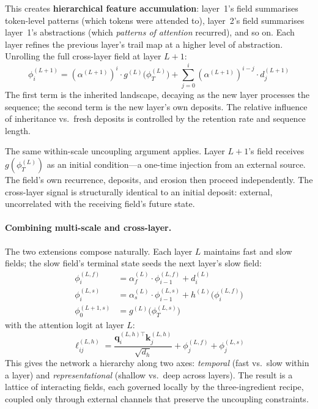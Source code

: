\documentclass[11pt,a4paper]{article}
\newcommand{\retain}{\alpha}
\newcommand{\q}{\bm{q}}
\newcommand{\K}{\bm{k}}
\begin{document}
This creates \textbf{hierarchical feature accumulation}: layer~1's
field summarises token-level patterns (which tokens were attended
to), layer~2's field summarises layer~1's abstractions (which
\emph{patterns of attention} recurred), and so on.  Each layer
refines the previous layer's trail map at a higher level of
abstraction.  Unrolling the full cross-layer field at layer $L+1$:
\begin{equation}
    \phi_i^{(L+1)} = (\retain^{(L+1)})^i \cdot g^{(L)}\!\bigl(\phi_T^{(L)}\bigr)
    + \sum_{j=0}^{i} (\retain^{(L+1)})^{i-j} \cdot d_j^{(L+1)}
    \label{eq:crosslayer_unrolled}
\end{equation}
The first term is the inherited landscape, decaying as the new
layer processes the sequence; the second term is the new layer's own
deposits.  The relative influence of inheritance vs.\ fresh deposits
is controlled by the retention rate and sequence length.

The same within-scale uncoupling argument applies.  Layer $L+1$'s
field receives $g(\phi_T^{(L)})$ as an initial condition---a
one-time injection from an external source.  The field's own
recurrence, deposits, and erosion then proceed independently.  The
cross-layer signal is structurally identical to an initial deposit:
external, uncorrelated with the receiving field's future state.

\paragraph{Combining multi-scale and cross-layer.}
The two extensions compose naturally.  Each layer $L$ maintains fast
and slow fields; the slow field's terminal state seeds the next
layer's slow field:
\begin{align}
    \phi_i^{(L,f)} &= \retain_f^{(L)} \cdot \phi_{i-1}^{(L,f)} + d_i^{(L)}
    \label{eq:combined_fast} \\
    \phi_i^{(L,s)} &= \retain_s^{(L)} \cdot \phi_{i-1}^{(L,s)} + h^{(L)}\!\bigl(\phi_i^{(L,f)}\bigr)
    \label{eq:combined_slow} \\
    \phi_0^{(L+1,s)} &= g^{(L)}\!\bigl(\phi_T^{(L,s)}\bigr)
    \label{eq:combined_cross}
\end{align}
with the attention logit at layer $L$:
\begin{equation}
    \ell_{ij}^{(L,h)} = \frac{\q_i^{(L,h)\top} \K_j^{(L,h)}}{\sqrt{d_h}}
    + \phi_j^{(L,f)} + \phi_j^{(L,s)}
    \label{eq:combined_logit}
\end{equation}
This gives the network a hierarchy along two axes:
\emph{temporal} (fast vs.\ slow within a layer) and
\emph{representational} (shallow vs.\ deep across layers).  The
result is a lattice of interacting fields, each governed locally by
the three-ingredient recipe, coupled only through external channels
that preserve the uncoupling constraints.
\end{document}
